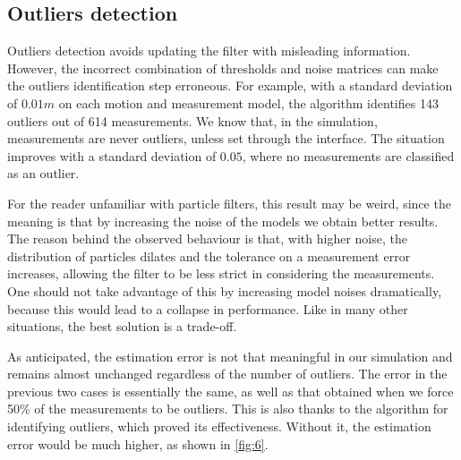 \documentclass[letterpaper,twocolumn,10pt]{article}
\begin{document}
\subsection*{Outliers detection}
Outliers detection avoids updating the filter with misleading information. However, the incorrect combination of thresholds and noise matrices can make the outliers identification step erroneous.
For example, with a standard deviation of $0.01m$ on each motion and measurement model, the algorithm identifies 143 outliers out of 614 measurements. We know that, in the simulation, measurements are never outliers, unless set through the interface. The situation improves with a standard deviation of $0.05$, where no measurements are classified as an outlier. 

For the reader unfamiliar with particle filters, this result may be weird, since the meaning is that by increasing the noise of the models we obtain better results. The reason behind the observed behaviour is that, with higher noise, the distribution of particles dilates and the tolerance on a measurement error increases, allowing the filter to be less strict in considering the measurements. One should not take advantage of this by increasing model noises dramatically, because this would lead to a collapse in performance. Like in many other situations, the best solution is a trade-off.

As anticipated, the estimation error is not that meaningful in our simulation and remains almost unchanged regardless of the number of outliers. The error in the previous two cases is essentially the same, as well as that obtained when we force 50\% of the measurements to be outliers. This is also thanks to the algorithm for identifying outliers, which proved its effectiveness. Without it, the estimation error would be much higher, as shown in \autoref{fig:6}.
\end{document}
